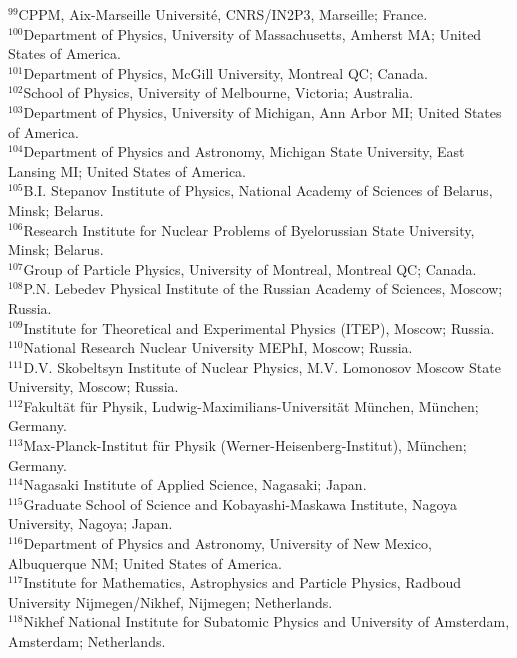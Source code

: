 \begin{flushleft}
$^{99}$CPPM, Aix-Marseille Universit\'e, CNRS/IN2P3, Marseille; France.\\
$^{100}$Department of Physics, University of Massachusetts, Amherst MA; United States of America.\\
$^{101}$Department of Physics, McGill University, Montreal QC; Canada.\\
$^{102}$School of Physics, University of Melbourne, Victoria; Australia.\\
$^{103}$Department of Physics, University of Michigan, Ann Arbor MI; United States of America.\\
$^{104}$Department of Physics and Astronomy, Michigan State University, East Lansing MI; United States of America.\\
$^{105}$B.I. Stepanov Institute of Physics, National Academy of Sciences of Belarus, Minsk; Belarus.\\
$^{106}$Research Institute for Nuclear Problems of Byelorussian State University, Minsk; Belarus.\\
$^{107}$Group of Particle Physics, University of Montreal, Montreal QC; Canada.\\
$^{108}$P.N. Lebedev Physical Institute of the Russian Academy of Sciences, Moscow; Russia.\\
$^{109}$Institute for Theoretical and Experimental Physics (ITEP), Moscow; Russia.\\
$^{110}$National Research Nuclear University MEPhI, Moscow; Russia.\\
$^{111}$D.V. Skobeltsyn Institute of Nuclear Physics, M.V. Lomonosov Moscow State University, Moscow; Russia.\\
$^{112}$Fakult\"at f\"ur Physik, Ludwig-Maximilians-Universit\"at M\"unchen, M\"unchen; Germany.\\
$^{113}$Max-Planck-Institut f\"ur Physik (Werner-Heisenberg-Institut), M\"unchen; Germany.\\
$^{114}$Nagasaki Institute of Applied Science, Nagasaki; Japan.\\
$^{115}$Graduate School of Science and Kobayashi-Maskawa Institute, Nagoya University, Nagoya; Japan.\\
$^{116}$Department of Physics and Astronomy, University of New Mexico, Albuquerque NM; United States of America.\\
$^{117}$Institute for Mathematics, Astrophysics and Particle Physics, Radboud University Nijmegen/Nikhef, Nijmegen; Netherlands.\\
$^{118}$Nikhef National Institute for Subatomic Physics and University of Amsterdam, Amsterdam; Netherlands.\\

\end{flushleft}
